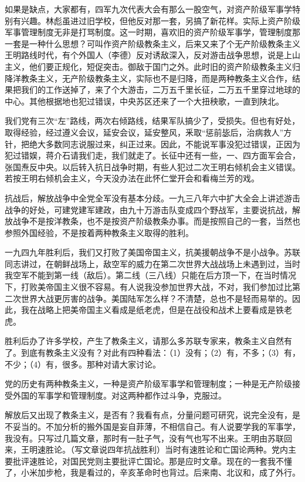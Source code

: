 如果是缺点，大家都有，四军九次代表大会有那么一股空气，对资产阶级军事学特别有兴趣。林彪虽进过旧学校，但他反对那一套，另搞了新花样。实际上资产阶级军事管理制度无非是打骂制度。这一时期，喜欢旧的资产阶级军事学，管理制度那一套是一种什么思想？可叫作资产阶级教条主义，后来又来了个无产阶级教条主义王明路线时代，有个外国人（李德）反对诱敌深入，反对游击战争思想，说是上山主义，他们要正规化，短促突击。御敌于国门之外。此时旧的资产阶级教条主义归降洋教条主义，无产阶级教条主义，实际也不是归降，而是两种教条主义合作，结果把我们的工作送掉了，来了个大游击，二万五千里长征，二万五千里穿过地球的中心。其他根据地也犯过错误，中央苏区还来了一个大扭秧歌，一直到陕北。

我们党有三次“左”路线，两次右倾路线，结果军队搞少了，受损失。但也有好处，取得经验，经过遵义会议，延安会议，延安整风，釆取“惩前毖后，治病救人”方针，把绝大多数同志说服过来，纠正过来。因此，不能说军事没犯过错误，正因为犯过错娱，蒋介石请我们走，我们就走了。长征中还有一些，一、四方面军会合，张国焘反中央。以后转入抗日战争时期，有些人犯过二次王明右倾机会主义错误。若按王明右倾机会主义，今天没办法在此怀仁堂开会和看梅兰芳的戏。

抗战后，解放战争中全党全军没有基本分歧。一九三八年六中扩大全会上讲述游击战争的好处，可建党建军建政，由九十万游击队变成四个野战军，主要说抗战，解放战争不是按洋教条，也不是按资产阶级教条办事。而是按照自己的一套，当然也参照外国经验，不是按着两种教条主义取得的胜利。

一九四九年胜利后，我们又打败了美国帝国主义，抗美援朝战争不是小战争。苏联同志讲过，在朝鲜战场上，敌空军的威力在第二次世界大战战场上未遇到过，当时我空军不能到第一线（敌后）。第二线（三八线）只能在后方顶一下，在当时情况下，打败美帝国主义很不容易。有人说我没参加世界大战，不对，我们参加过比第二次世界大战更厉害的战争。美国陆军怎么样？不清楚，总也不是轻而易举的。因此，我在战略上把美帝国主义看成是纸老虎，但是在战役和战术上要看成是铁老虎。

胜利后办了许多学校，产生了教条主义，请那么多苏联专家来，教条主义自然有了。到底有教条主义没有？对此有四种看法：（1）没有；（2）有，不多；（3）有，不少；（4）有，很多。那种对请大家讨论。

党的历史有两种教条主义，一种是资产阶级军事学和管理制度；一种是无产阶级接受外国的军事学和管理制度。对这两种都作过斗争，克服过。

解放后又出现了教条主义，是否有？我看有点，分量问题可研究，说完全没有，是不妥当的。不加分析的搬外国是妄自菲薄，不相信自己。有人说要学我的军事学，我没有。只写过几篇文章，那时有一肚子气，没有气也写不出来。王明由苏联回来，王明速胜论。（写文章说四年抗战胜利）当时有速胜论和亡国论两种。党内主要批评速胜论，对国民党则主要批评亡国论。那是应时文章。现在的一套我不懂了，小米加步枪，我是看过的，辛亥革命时也背过。后来南、北议和，成了外行。

